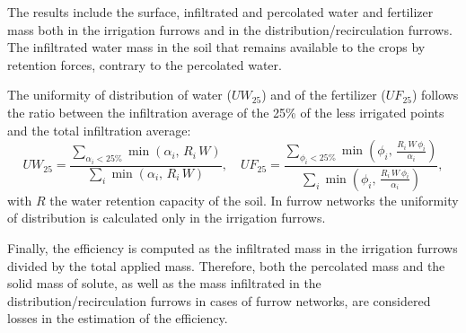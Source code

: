 \documentclass[review,authoryear]{elsarticle}
\newcommand{\eq}[2]{\begin{equation}\label{#2}#1\end{equation}}
\newcommand{\PA}[1] {\left(#1\right)}
\begin{document}
The results include the surface, infiltrated and percolated water and fertilizer
mass both in the irrigation furrows and in the distribution/recirculation
furrows. The infiltrated water mass in the soil that remains available to the
crops by retention forces, contrary to the percolated water.

The uniformity of distribution of water ($UW_{25}$) and of the fertilizer
($UF_{25}$) follows the ratio between the infiltration average of the 25\% of
the less irrigated points and the total infiltration average:
\eq
{
	UW_{25}=\frac{\displaystyle\sum_{\alpha_i<25\%}\min\PA{\alpha_i,\,R_i\,W}}
		{\displaystyle\sum_i\min\PA{\alpha_i,\,R_i\,W}},\quad
	UF_{25}=\frac{\displaystyle
		\sum_{\phi_i<25\%}\min\PA{\phi_i,\,\frac{R_i\,W\,\phi_i}{\alpha_i}}}
		{\displaystyle\sum_i\min\PA{\phi_i,\,\frac{R_i\,W\,\phi_i}{\alpha_i}}},
}{EqUniformity}
with $R$ the water retention capacity of the soil. In furrow networks the
uniformity of distribution is calculated only in the irrigation furrows.

Finally, the efficiency is computed as the infiltrated mass in the irrigation
furrows divided by the total applied mass. Therefore, both the percolated mass
and the solid mass of solute, as well as the mass infiltrated in the
distribution/recirculation furrows in cases of furrow networks, are considered
losses in the estimation of the efficiency. 
\end{document}

